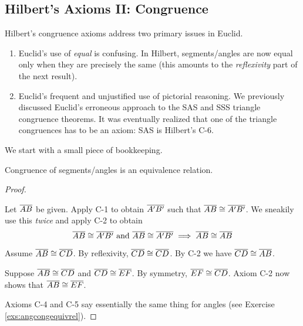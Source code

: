 \clearpage



\subsection{Hilbert's Axioms II: Congruence}\label{sec:hilbert2}

Hilbert's congruence axioms address two primary issues in Euclid.
\begin{enumerate}
  \item Euclid's use of \emph{equal} is confusing. In Hilbert, segments/angles are now equal only when they are precisely the same (this amounts to the \emph{reflexivity} part of the next result).
  \item Euclid's frequent and unjustified use of pictorial reasoning. We previously discussed Euclid's erroneous approach to the SAS and SSS triangle congruence theorems. It was eventually realized that one of the triangle congruences has to be an axiom: SAS is Hilbert's C-6.
\end{enumerate}

We start with a small piece of bookkeeping.

\begin{lemm}{}{}
	Congruence of segments/angles is an equivalence relation.
\end{lemm}

\begin{proof}
	\begin{description}\itemsep0pt
  	\item[\normalfont(\emph{Reflexivity})] Let $\overline{AB}$ be given. Apply C-1 to obtain %
  	$\overline{A'B'}$ such that $\overline{AB}\cong\overline{A'B'}$. We sneakily use this \emph{twice} and apply C-2 to obtain
  	\[
  		\overline{AB}\cong\overline{A'B'}\text{ and } \overline{AB}\cong\overline{A'B'}\implies \overline{AB}\cong\overline{AB}
  	\]
  	\item[\normalfont(\emph{Symmetry})] Assume $\overline{AB}\cong\overline{CD}$. By reflexivity, $\overline{CD}\cong\overline{CD}$. By C-2 we have $\overline{CD}\cong\overline{AB}$.
  	\item[\normalfont(\emph{Transitivity})] Suppose $\overline{AB}\cong\overline{CD}$ and $\overline{CD}\cong\overline{EF}$. By symmetry, $\overline{EF}\cong\overline{CD}$. Axiom C-2 now shows that $\overline{AB}\cong\overline{EF}$.
  \end{description}
  \medskip
  Axioms C-4 and C-5 say essentially the same thing for angles (see Exercise \ref{exs:angcongequivrel}).
\end{proof}


